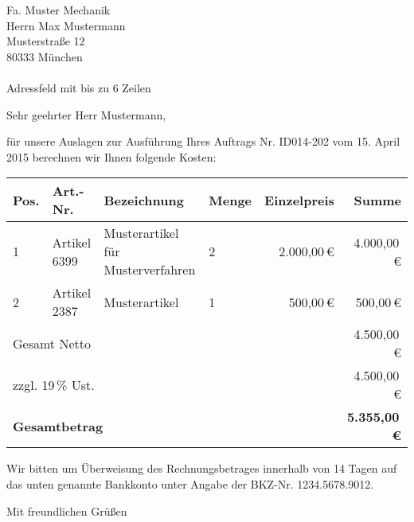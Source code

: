 \documentclass[german]{tumletter}
\begin{document}
\begin{letter}{Fa. Muster Mechanik\\Herrn Max Mustermann\\
    Musterstraße 12\\80333 München\\~\\Adressfeld mit bis zu 6 Zeilen}

  \opening{Sehr geehrter Herr Mustermann,}
  \raggedright
  für unsere Auslagen zur Ausführung Ihres Auftrags Nr. ID014-202 vom
  15. April 2015 berechnen wir Ihnen folgende Kosten:

  \vspace{5mm}
  \setlength{\tabcolsep}{1em}
  \begin{tabular}{lp{2cm}p{4cm}lrr}
    \toprule
    \textbf{Pos.} & \textbf{Art.-Nr.}
                  & \textbf{Bezeichnung}
                  & \textbf{Menge}
                  & \textbf{Einzelpreis}
                  & \textbf{Summe}                    \\
    \midrule
    1             & Artikel 6399
                  & Musterartikel für Musterverfahren
                  & 2
                  & 2.000,00\,€
                  & 4.000,00\,€                       \\
    2             & Artikel 2387
                  & Musterartikel
                  & 1
                  & 500,00\,€
                  & 500,00\,€                         \\
    \midrule
    \multicolumn{5}{l}{Gesamt Netto}
                  & 4.500,00\,€                       \\
    \multicolumn{5}{l}{zzgl. 19\,\% Ust.}
                  & 4.500,00\,€                       \\[1ex]
    \multicolumn{5}{l}{\textbf{Gesamtbetrag}}
                  & \textbf{5.355,00\,€}              \\
    \bottomrule
  \end{tabular}
  \vspace{5mm}

  Wir bitten um Überweisung des Rechnungsbetrages innerhalb von 14 Tagen auf
  das unten genannte Bankkonto unter Angabe der BKZ-Nr. 1234.5678.9012.

  \closing{Mit freundlichen Grüßen}
\end{letter}
\end{document}

